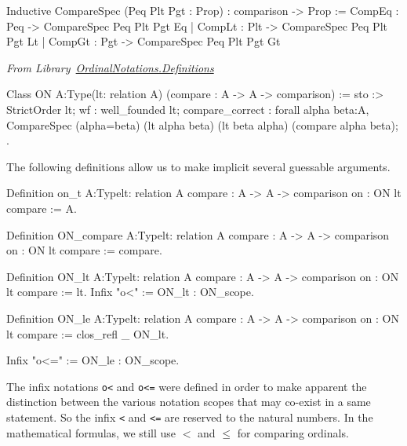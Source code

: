 \documentclass[a4paper]{book}
\begin{document}
\begin{Coqsrc}
Inductive CompareSpec (Peq Plt Pgt : Prop) : comparison -> Prop :=
    CompEq : Peq -> CompareSpec Peq Plt Pgt Eq
  | CompLt : Plt -> CompareSpec Peq Plt Pgt Lt
  | CompGt : Pgt -> CompareSpec Peq Plt Pgt Gt
\end{Coqsrc}

\vspace{4pt}
\noindent\emph{From Library~\href{../src/html/hydras.OrdinalNotations.Definitions.html}{OrdinalNotations.Definitions}}

\label{types:ON}

\begin{Coqsrc}
Class ON {A:Type}(lt: relation A)
      (compare : A -> A -> comparison)  :=
  {
  sto :> StrictOrder lt;
  wf : well_founded lt;
  compare_correct :
    forall alpha beta:A,
      CompareSpec (alpha=beta) (lt alpha beta) (lt beta alpha)
                  (compare alpha beta);
  }.
\end{Coqsrc}

The following definitions allow us to make implicit several guessable arguments.
\label{sect:on-lt-notation}
\label{sect:on-le-notation}
\begin{Coqsrc}
Definition on_t  {A:Type}{lt: relation A}
            {compare : A -> A -> comparison}
            {on : ON lt compare} := A.

Definition ON_compare {A:Type}{lt: relation A}
            {compare : A -> A -> comparison}
            {on : ON lt compare} := compare.

Definition ON_lt {A:Type}{lt: relation A}
           {compare : A -> A -> comparison}
           {on : ON lt compare} := lt.
Infix "o<" := ON_lt : ON_scope.

Definition ON_le  {A:Type}{lt: relation A}
           {compare : A -> A -> comparison}
           {on : ON lt compare} :=
  clos_refl _ ON_lt.

Infix "o<=" := ON_le : ON_scope.
\end{Coqsrc}


\begin{remark}
The infix notations \texttt{o<} and \texttt{o<=} were defined in order to make apparent the distinction between the various notation scopes that may co-exist in a same statement. So the infix \texttt{<} and \texttt{<=} are reserved to the natural numbers. In the mathematical formulas, we still use $<$ and $\leq$ for comparing ordinals.
\end{remark}
\end{document}
